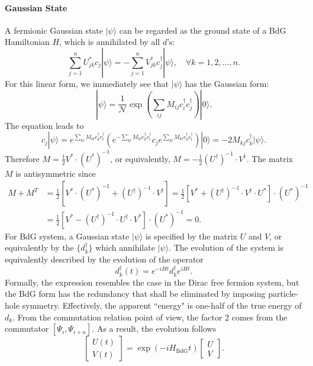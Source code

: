 \documentclass{SciPost}
\begin{document}
\paragraph{Gaussian State}
A fermionic Gaussian state $|\psi\rangle$ can be regarded as the ground state of a BdG Hamiltonian $H$, which is annihilated by all $d$'s:
\begin{equation}
	\sum_{j=1}^n U_{jk}^* c_j|\psi\rangle = - \sum_{j=1}^n V_{jk}^* c_j^\dagger|\psi\rangle, \quad\forall k =1,2,\dots,n.
\end{equation}
For this linear form, we immediately see that $|\psi\rangle$ has the Gaussian form:
\begin{equation}
	|\psi\rangle = \frac{1}{\mathcal N} \exp\left(\sum_{ij}M_{ij}c_i^\dagger c_j^\dagger\right)|0\rangle.
\end{equation}
The equation leads to
\begin{equation*}
	c_j |\psi\rangle = e^{\sum_{kl}M_{kl}c_k^\dagger c_l^\dagger} \left(e^{-\sum_{kl}M_{kl}c_k^\dagger c_l^\dagger} c_j e^{\sum_{kl}M_{kl}c_k^\dagger c_l^\dagger}\right) |0\rangle 
	= -2 M_{kj} c_k^\dagger|\psi\rangle.
\end{equation*}
Therefore $M = \frac{1}{2} V^* \cdot (U^*)^{-1}$, or equivalently, $M = -\frac{1}{2}(U^\dagger)^{-1} \cdot V^\dagger$.
The matrix $M$ is antisymmetric since
\begin{equation*}
\begin{aligned}
	M + M^T 
	&= \frac{1}{2} \left[V^* \cdot (U^*)^{-1} + (U^\dagger)^{-1} \cdot V^\dagger\right] 
	= \frac{1}{2} \left[V^*  + (U^\dagger)^{-1} \cdot V^\dagger \cdot U^*\right] \cdot  (U^*)^{-1} \\
	&= \frac{1}{2} \left[V^*  - (U^\dagger)^{-1} \cdot  U^\dagger \cdot V^*\right] \cdot  (U^*)^{-1} =0.
\end{aligned}
\end{equation*}
For BdG system, a Gaussian state $|\psi\rangle$ is specified by the matrix $U$ and $V$, or equivalently by the $\{d^\dagger_k\}$ which annihilate $|\psi\rangle$.
The evolution of the system is equivalently described by the evolution of the operator
\begin{equation}
	d_k^\dagger(t) = e^{-iHt} d_k^\dagger e^{iHt}.
\end{equation}
Formally, the expression resembles the case in the Dirac free fermion system, but the BdG form has the redundancy that shall be eliminated by imposing particle-hole symmetry. Effectively,  the apparent ``energy" is one-half of the true energy of $d_k$. From the commutation relation point of view, the factor 2 comes from the commutator $[\Psi_i, \Psi_{i+n}]$. As a result, the evolution follows
\begin{equation*}
	\begin{bmatrix} U(t) \\ V(t) \end{bmatrix}
	= \exp(-iH_\text{BdG}t)\begin{bmatrix} U \\ V \end{bmatrix}.
\end{equation*}
\end{document}
